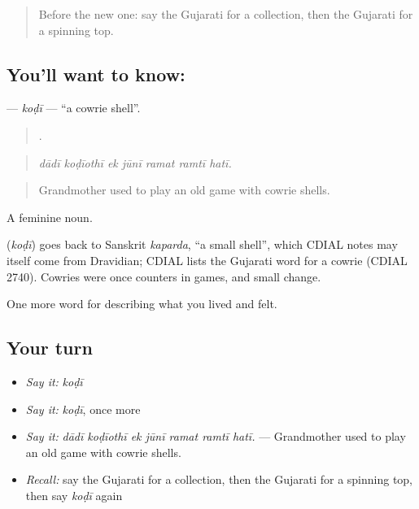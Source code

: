 \label{lesson:GU-C524-kodi}



\begin{quote}
Before the new one: say the Gujarati for a collection, then the Gujarati for a spinning top.
\end{quote}

\subsection*{You'll want to know: }
\textbf{} — \emph{koḍī} — \textquotedblleft{}a cowrie shell\textquotedblright{}.

\begin{quote}
      .
\end{quote}

\begin{quote}
\emph{dādī koḍīothī ek jūnī ramat ramtī hatī.}
\end{quote}

\begin{quote}
Grandmother used to play an old game with cowrie shells.
\end{quote}

A feminine noun.

\begin{cousinweb}
\textbf{} (\emph{koḍī}) goes back to Sanskrit \emph{kaparda}, \textquotedblleft{}a small shell\textquotedblright{}, which CDIAL notes may itself come from Dravidian; CDIAL lists the Gujarati word for a cowrie (CDIAL 2740). Cowries were once counters in games, and small change.
\end{cousinweb}

\begin{grammarlens}[title={What you've built}]
One more word for describing what you lived and felt.
\end{grammarlens}

\subsection*{Your turn}
\begin{itemize}
\raggedright
  \item \emph{Say it:} \emph{koḍī}
  \item \emph{Say it:} \emph{koḍī}, once more
  \item \emph{Say it:} \emph{dādī koḍīothī ek jūnī ramat ramtī hatī.} — Grandmother used to play an old game with cowrie shells.
  \item \emph{Recall:} say the Gujarati for a collection, then the Gujarati for a spinning top, then say \emph{koḍī} again
\end{itemize}

